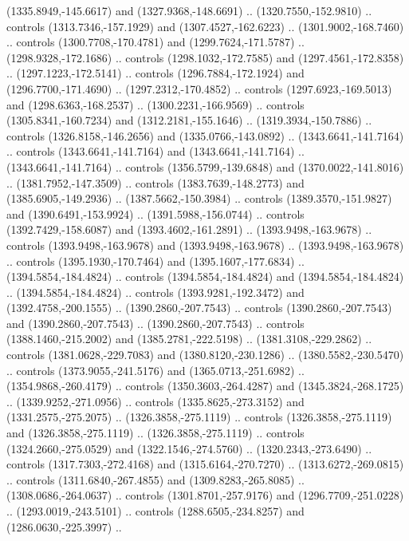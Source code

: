\begin{scope}[shift={(-22.88722,-49.76189)}]
\begin{scope}[shift={(-739.46591,328.36782)}]
      (1335.8949,-145.6617) and (1327.9368,-148.6691) .. (1320.7550,-152.9810) ..
      controls (1313.7346,-157.1929) and (1307.4527,-162.6223) ..
      (1301.9002,-168.7460) .. controls (1300.7708,-170.4781) and
      (1299.7624,-171.5787) .. (1298.9328,-172.1686) .. controls
      (1298.1032,-172.7585) and (1297.4561,-172.8358) .. (1297.1223,-172.5141) ..
      controls (1296.7884,-172.1924) and (1296.7700,-171.4690) ..
      (1297.2312,-170.4852) .. controls (1297.6923,-169.5013) and
      (1298.6363,-168.2537) .. (1300.2231,-166.9569) .. controls
      (1305.8341,-160.7234) and (1312.2181,-155.1646) .. (1319.3934,-150.7886) ..
      controls (1326.8158,-146.2656) and (1335.0766,-143.0892) ..
      (1343.6641,-141.7164) .. controls (1343.6641,-141.7164) and
      (1343.6641,-141.7164) .. (1343.6641,-141.7164) .. controls
      (1356.5799,-139.6848) and (1370.0022,-141.8016) .. (1381.7952,-147.3509) ..
      controls (1383.7639,-148.2773) and (1385.6905,-149.2936) ..
      (1387.5662,-150.3984) .. controls (1389.3570,-151.9827) and
      (1390.6491,-153.9924) .. (1391.5988,-156.0744) .. controls
      (1392.7429,-158.6087) and (1393.4602,-161.2891) .. (1393.9498,-163.9678) ..
      controls (1393.9498,-163.9678) and (1393.9498,-163.9678) ..
      (1393.9498,-163.9678) .. controls (1395.1930,-170.7464) and
      (1395.1607,-177.6834) .. (1394.5854,-184.4824) .. controls
      (1394.5854,-184.4824) and (1394.5854,-184.4824) .. (1394.5854,-184.4824) ..
      controls (1393.9281,-192.3472) and (1392.4758,-200.1555) ..
      (1390.2860,-207.7543) .. controls (1390.2860,-207.7543) and
      (1390.2860,-207.7543) .. (1390.2860,-207.7543) .. controls
      (1388.1460,-215.2002) and (1385.2781,-222.5198) .. (1381.3108,-229.2862) ..
      controls (1381.0628,-229.7083) and (1380.8120,-230.1286) ..
      (1380.5582,-230.5470) .. controls (1373.9055,-241.5176) and
      (1365.0713,-251.6982) .. (1354.9868,-260.4179) .. controls
      (1350.3603,-264.4287) and (1345.3824,-268.1725) .. (1339.9252,-271.0956) ..
      controls (1335.8625,-273.3152) and (1331.2575,-275.2075) ..
      (1326.3858,-275.1119) .. controls (1326.3858,-275.1119) and
      (1326.3858,-275.1119) .. (1326.3858,-275.1119) .. controls
      (1324.2660,-275.0529) and (1322.1546,-274.5760) .. (1320.2343,-273.6490) ..
      controls (1317.7303,-272.4168) and (1315.6164,-270.7270) ..
      (1313.6272,-269.0815) .. controls (1311.6840,-267.4855) and
      (1309.8283,-265.8085) .. (1308.0686,-264.0637) .. controls
      (1301.8701,-257.9176) and (1296.7709,-251.0228) .. (1293.0019,-243.5101) ..
      controls (1288.6505,-234.8257) and (1286.0630,-225.3997) ..

\end{scope}
\end{scope}
